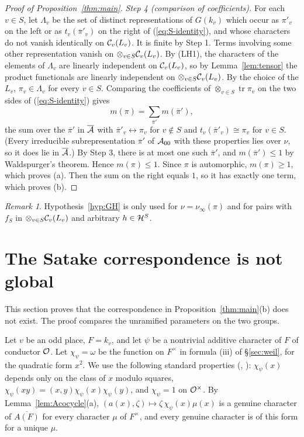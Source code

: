 \documentclass[12pt,letterpaper,openany]{book}
\theoremstyle{plain}
\theoremstyle{definition}
\theoremstyle{remark}
\newtheorem{remark}[theorem]{Remark}
\theoremstyle{remark}
\newcommand{\tr}{\operatorname{tr}}
\begin{document}
\begin{proof}[Proof of Proposition~\ref{thm:main}]
{\em Step 4 (comparison of coefficients).} For each $v\in S$, let
$\Lambda_v$ be the set of distinct representations of $G(k_v)$ which
occur as $\pi'_v$ on the left or as $t_v(\overline{\pi}'_v)$ on the right
of (\ref{eq:S-identity}), and whose characters do not vanish identically
on ${\cal C}_v(L_v)$. It is finite by Step 1. Terms involving some other
representation vanish on $\otimes_{v\in S}{\cal C}_v(L_v)$. By (LH1), the
characters of the elements of $\Lambda_v$ are linearly independent on
${\cal C}_v(L_v)$, so by Lemma~\ref{lem:tensor} the product functionals
are linearly independent on $\otimes_{v\in S}{\cal C}_v(L_v)$. By the
choice of the $L_v$, $\pi_v\in\Lambda_v$ for every $v\in S$. Comparing
the coefficients of $\otimes_{v\in S}\tr \pi_v$ on the two sides of
(\ref{eq:S-identity}) gives
\[
m(\pi)=\sum_{\overline{\pi}'}m(\overline{\pi}'),
\]
the sum over the $\overline{\pi}'$ in $\overline{\cal A}$ with
$\overline{\pi}'_v\leftrightarrow\pi_v$ for
$v\notin S$ and $t_v(\overline{\pi}'_v)\cong\pi_v$ for $v\in S$. (Every
irreducible subrepresentation $\overline\pi'$ of ${\cal A}_{00}$ with these
properties lies over $\nu$, so it does lie in $\overline{\cal A}$.)
By Step 3, there is at most one such $\overline{\pi}'$, and
$m(\overline{\pi}')\leq 1$ by Waldspurger's theorem. Hence $m(\pi)\leq 1$.
Since $\pi$ is automorphic, $m(\pi)\geq 1$, which proves (a). Then the
sum on the right equals $1$, so it has exactly one term, which proves (b).
\end{proof}

\begin{remark}
Hypothesis~\ref{hyp:GH} is only used for $\nu=\nu_\infty(\pi)$ and for
pairs with $f_S$ in $\otimes_{v\in S}{\cal C}_v(L_v)$ and arbitrary
$h\in{\cal H}^S$.
\end{remark}

\section{The Satake correspondence is not global}\label{sec:nonexist}

This section proves that the correspondence in
Proposition~\ref{thm:main}(b) does not exist. The proof compares the
unramified parameters on the two groups.

Let $v$ be an odd place, $F=k_v$, and let $\psi$ be a nontrivial additive
character of $F$ of conductor ${\cal O}$. Let $\chi_\psi=\omega$ be the
function on $F^\times$ in formula (iii) of \S\ref{sec:weil}, for the
quadratic form $x^2$. We use the following standard properties
(\cite{Ge2}, \cite{Rao}): $\chi_\psi(x)$ depends only on the class of $x$
modulo squares, $\chi_\psi(xy)=(x,y)\chi_\psi(x)\chi_\psi(y)$, and
$\chi_\psi=1$ on ${\cal O}^\times$. By Lemma~\ref{lem:Acocycle}(a),
$(a(x),\zeta)\mapsto\zeta\,\chi_\psi(x)\mu(x)$ is a genuine character of
$\overline{A(F)}$ for every character $\mu$ of $F^\times$, and every
genuine character is of this form for a unique $\mu$.
\end{document}
